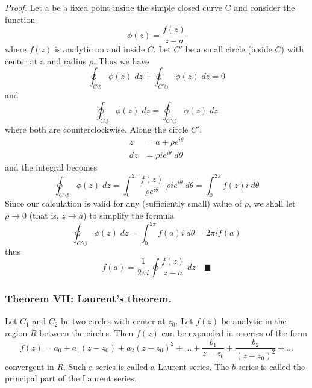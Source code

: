 \documentclass[../../../main.tex]{subfiles}
\begin{document}
\emph{Proof.} Let a be a ﬁxed point inside the simple closed curve C and consider the function
\begin{equation*}
    \phi(z)=\frac{f(z)}{z-a}
\end{equation*}
where $f(z)$ is analytic on and inside $C$. Let $C'$ be a small circle (inside $C$) with center at a and radius $\rho$. Thus we have
\begin{equation*}
    \oint_{C\circlearrowleft} \phi(z)\;dz+\oint_{C'\circlearrowright} \phi(z)\;dz=0
\end{equation*}
and
\begin{equation*}
    \oint_{C\circlearrowleft} \phi(z)\;dz=\oint_{C'\circlearrowleft} \phi(z)\;dz
\end{equation*}
where both are counterclockwise. Along the circle $C'$,
\begin{align*}
    z  & = a + \rho e^{i\theta}       \\
    dz & =\rho i e^{i\theta}\;d\theta
\end{align*}
and the integral becomes
\begin{equation*}
    \oint_{C'\circlearrowleft} \phi(z)\;dz=\int_{0}^{2\pi} \frac{f(z)}{ \rho e^{i\theta}}\;\rho i e^{i\theta}\;d\theta=\int_{0}^{2\pi}f(z)i\;d\theta
\end{equation*}
Since our calculation is valid for any (sufficiently small) value of $\rho$, we shall let
$\rho\rightarrow0$ (that is, $z\rightarrow a$) to simplify the formula
\begin{equation*}
    \oint_{C'\circlearrowleft} \phi(z)\;dz=\int_{0}^{2\pi}f(a)i\;d\theta=2\pi if(a)
\end{equation*}
thus
\begin{equation*}
    f(a)=\frac{1}{2\pi i}\oint \frac{f(z)}{z-a}\;dz \quad \blacksquare
\end{equation*}

\subsubsection{Theorem VII: Laurent's theorem.} Let $C_1$ and $C_2$ be two circles with center at $z_0$. Let $f(z)$ be analytic in the region $R$ between the circles. Then $f(z)$ can be expanded in a series of the form
\begin{equation*}
    f(z) = a_0 + a_1(z - z_0) + a_2(z - z_0)^2+\dots+\frac{b_1}{z-z_0}+\frac{b_2}{(z-z_0)^2}+\dots
\end{equation*}
convergent in $R$. Such a series is called a Laurent series. The $b$ series is called the principal part of the Laurent series.
\end{document}
